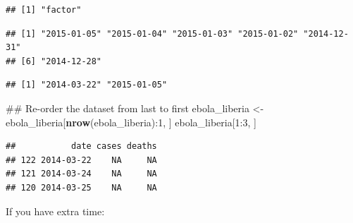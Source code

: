 \documentclass[]{book}
\makeatletter
\newenvironment{Shaded}{\begin{snugshade}}{\end{snugshade}}
\newcommand{\KeywordTok}[1]{\textcolor[rgb]{0.13,0.29,0.53}{\textbf{{#1}}}}
\newcommand{\DataTypeTok}[1]{\textcolor[rgb]{0.13,0.29,0.53}{{#1}}}
\newcommand{\DecValTok}[1]{\textcolor[rgb]{0.00,0.00,0.81}{{#1}}}
\newcommand{\StringTok}[1]{\textcolor[rgb]{0.31,0.60,0.02}{{#1}}}
\newcommand{\NormalTok}[1]{{#1}}
\newenvironment{kframe}{%
\medskip{}
\setlength{\fboxsep}{.8em}
 \def\at@end@of@kframe{}%
 \ifinner\ifhmode%
  \def\at@end@of@kframe{\end{minipage}}%
  \begin{minipage}{\columnwidth}%
 \fi\fi%
 \def\FrameCommand##1{\hskip\@totalleftmargin \hskip-\fboxsep
 \colorbox{shadecolor}{##1}\hskip-\fboxsep
     \hskip-\linewidth \hskip-\@totalleftmargin \hskip\columnwidth}%
 \MakeFramed {\advance\hsize-\width
   \@totalleftmargin\z@ \linewidth\hsize
   \@setminipage}}%
 {\par\unskip\endMakeFramed%
 \at@end@of@kframe}
\renewenvironment{Shaded}{\begin{kframe}}{\end{kframe}}
\makeatother
\begin{document}
\begin{verbatim}
## [1] "factor"
\end{verbatim}

\begin{Shaded}
\end{Shaded}

\begin{verbatim}
## [1] "2015-01-05" "2015-01-04" "2015-01-03" "2015-01-02" "2014-12-31"
## [6] "2014-12-28"
\end{verbatim}

\begin{Shaded}
\end{Shaded}

\begin{verbatim}
## [1] "2014-03-22" "2015-01-05"
\end{verbatim}

\begin{Shaded}
\begin{Highlighting}[]
\NormalTok{## Re-order the dataset from last to first}
\NormalTok{ebola_liberia <-}\StringTok{ }\NormalTok{ebola_liberia[}\KeywordTok{nrow}\NormalTok{(ebola_liberia):}\DecValTok{1}\NormalTok{, ]}
\NormalTok{ebola_liberia[}\DecValTok{1}\NormalTok{:}\DecValTok{3}\NormalTok{, ]}
\end{Highlighting}
\end{Shaded}

\begin{verbatim}
##           date cases deaths
## 122 2014-03-22    NA     NA
## 121 2014-03-24    NA     NA
## 120 2014-03-25    NA     NA
\end{verbatim}

If you have extra time:
\end{document}

